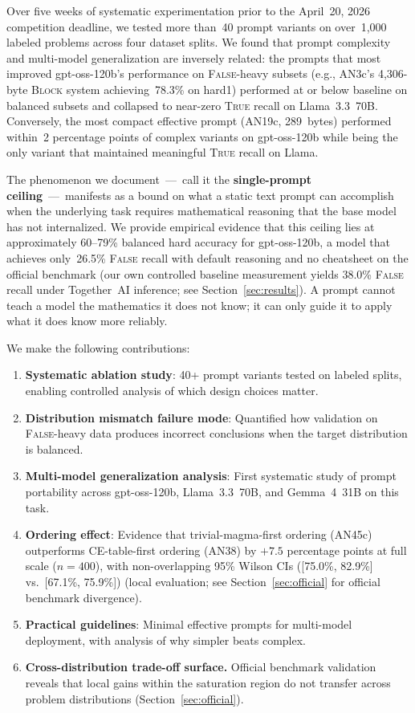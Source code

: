 \documentclass[11pt]{article}
\begin{document}
Over five weeks of systematic experimentation prior to the April~20,
2026 competition deadline, we tested more than~40 prompt variants on
over~1{,}000 labeled problems across four dataset splits. We found that
prompt complexity and multi-model generalization are inversely related:
the prompts that most improved gpt-oss-120b's performance on
\textsc{False}-heavy subsets (e.g., AN3c's 4{,}306-byte \textsc{Block}
system achieving~78.3\% on hard1) performed at or below baseline on
balanced subsets and collapsed to near-zero \textsc{True} recall on
Llama~3.3~70B. Conversely, the most compact effective prompt (AN19c,
289~bytes) performed within~2 percentage points of complex variants on
gpt-oss-120b while being the only variant that maintained meaningful
\textsc{True} recall on Llama.

The phenomenon we document~---~call it the \textbf{single-prompt
ceiling}~---~manifests as a bound on what a static text prompt can
accomplish when the underlying task requires mathematical reasoning that
the base model has not internalized. We provide empirical evidence that
this ceiling lies at approximately 60--79\% balanced hard accuracy for
gpt-oss-120b, a model that achieves only~26.5\% \textsc{False} recall
with default reasoning and no cheatsheet on the official benchmark (our
own controlled baseline measurement yields 38.0\% \textsc{False} recall
under Together~AI inference; see Section~\ref{sec:results}). A
prompt cannot teach a model the mathematics it does not know; it can
only guide it to apply what it does know more reliably.

We make the following contributions:
\begin{enumerate}
  \item \textbf{Systematic ablation study}: 40+ prompt variants tested
    on labeled splits, enabling controlled analysis of which design
    choices matter.
  \item \textbf{Distribution mismatch failure mode}: Quantified how
    validation on \textsc{False}-heavy data produces incorrect
    conclusions when the target distribution is balanced.
  \item \textbf{Multi-model generalization analysis}: First systematic
    study of prompt portability across gpt-oss-120b, Llama~3.3~70B,
    and Gemma~4~31B on this task.
  \item \textbf{Ordering effect}: Evidence that trivial-magma-first
    ordering (AN45c) outperforms CE-table-first ordering (AN38) by
    $+7.5$ percentage points at full scale ($n=400$), with
    non-overlapping 95\% Wilson CIs ([75.0\%, 82.9\%] vs.\
    [67.1\%, 75.9\%]) (local evaluation; see Section~\ref{sec:official}
    for official benchmark divergence).
  \item \textbf{Practical guidelines}: Minimal effective prompts for
    multi-model deployment, with analysis of why simpler beats complex.
  \item \textbf{Cross-distribution trade-off surface.} Official benchmark
    validation reveals that local gains within the saturation region do
    not transfer across problem distributions
    (Section~\ref{sec:official}).
\end{enumerate}
\end{document}
